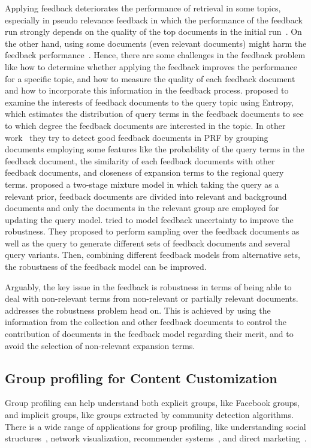 Applying feedback deteriorates the performance of retrieval in some topics, especially in pseudo relevance feedback in which the performance of the feedback run strongly depends on the quality of the top documents in the initial run~\citep{Harman:2009,Collins-Thompson:2009}. 
On the other hand, using some documents (even relevant documents) might harm the feedback performance~\citep{Terra:2005,Lv:2009:CIKM}.  
Hence, there are some challenges in the feedback problem like how to determine whether applying the feedback improves the performance for a specific topic, and how to measure the quality of each feedback document and how to incorporate this information in the feedback process.
%
\citet{He:2009:CIKM} proposed to examine the interests of feedback documents to the query topic using Entropy, which estimates the distribution of query terms in the feedback documents to see to which degree the feedback documents are interested in the topic.  In other work~\citep{He:2009:ECIR} they try to detect good feedback documents in PRF by grouping documents employing some features like the probability of the query terms in the feedback document, the similarity of each feedback documents with other feedback documents, and closeness of expansion terms to the regional query terms. 
\citet{Tao:2004} proposed a two-stage mixture model in which taking the query as a relevant prior, feedback documents are divided into relevant and background documents and only the documents in the relevant group are employed for updating the query model. 
\citet{Collins-Thompson:2007} tried to model feedback uncertainty to improve the robustness. They proposed to perform sampling over the feedback documents as well as the query to generate different sets of feedback documents and several query variants. Then, combining different feedback models from alternative sets, the robustness of the feedback model can be  improved.

\medskip
Arguably, the key issue in the feedback is robustness in terms of being able to deal with non-relevant terms from non-relevant or partially relevant documents. \acswlm addresses the robustness problem head on. This is achieved by using the information from the collection and other feedback documents to control the contribution of documents in the feedback model regarding their merit, and to avoid the selection of non-relevant expansion terms.

\subsection{Group profiling for Content Customization}
Group profiling can help understand both explicit groups, like Facebook groups, and implicit groups, like groups extracted by community detection algorithms. There is a wide range of applications for group profiling, like understanding social structures~\citep{Tang:2011}, network visualization, recommender systems~\citep{Hu:2014,Shang:2014,Amer-Yahia}, and direct marketing~\citep{Custers:2003}. 

